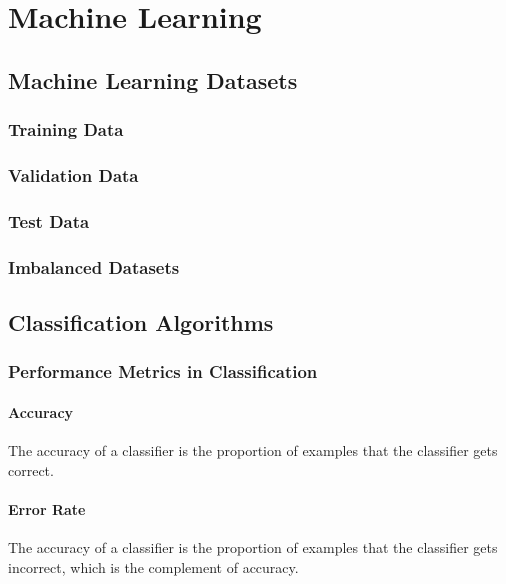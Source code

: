 \documentclass[11pt]{report} %
\begin{document}
\chapter{Machine Learning}

\section{Machine Learning Datasets}

\subsection{Training Data}

\subsection{Validation Data}

\subsection{Test Data}

\subsection{Imbalanced Datasets}

\section{Classification Algorithms}

\subsection{Performance Metrics in Classification \cite{Goodfellow2016}}

\subsubsection{Accuracy}

The accuracy of a classifier is the proportion of examples that the classifier gets correct.

\subsubsection{Error Rate}

The accuracy of a classifier is the proportion of examples that the classifier gets incorrect, which is the complement of accuracy.
\end{document}
